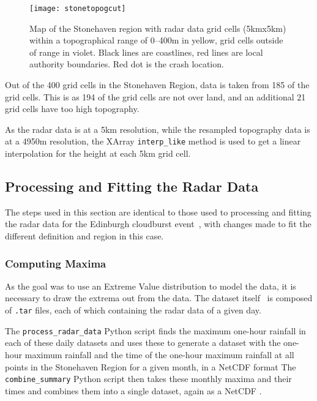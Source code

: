 \begin{figure}[H]
    \begin{center}
        \texttt{[image: stonetopogcut]}
    \end{center}
    \caption[Map of the Stonehaven region with radar data grid cells within a range of 0--400m.]{
        Map of the Stonehaven region with radar data grid cells (5kmx5km) within a topographical range of 0--400m in yellow,
    grid cells outside of range in violet.
    Black lines are coastlines, red lines are local authority boundaries.
    Red dot is the crash location.}
    \label{fig:stonetopogallowed}
\end{figure}

Out of the 400 grid cells in the Stonehaven Region,
    data is taken from 185 of the grid cells.
This is as 194 of the grid cells are not over land,
    and an additional 21 grid cells have too high topography.

As the radar data is at a 5km resolution,
    while the resampled topography data is at a 4950m resolution,
    the XArray \texttt{interp\_like} method is used to get a linear interpolation for the height at each 5km grid cell.

\subsection{Processing and Fitting the Radar Data}\label{subsec:radarprocess}

The steps used in this section are identical to those used to processing and fitting the radar data for the Edinburgh cloudburst event~\cite{Tett_Soon},
    with changes made to fit the different definition and region in this case.

\subsubsection{Computing Maxima}

As the goal was to use an Extreme Value distribution to model the data,
    it is necessary to draw the extrema out from the data.
The dataset itself~\cite{radar_data} is composed of \texttt{.tar} files, each of which containing the radar data of a given day.

The \texttt{process\_radar\_data} Python script finds the maximum one-hour rainfall in each of these daily datasets and
    uses these to generate a dataset with the one-hour maximum rainfall and the time of the one-hour maximum rainfall
    at all points in the Stonehaven Region for a given month, in a NetCDF format
The \texttt{combine\_summary} Python script then takes these monthly maxima and their times and combines them into a single dataset,
    again as a NetCDF .

